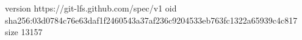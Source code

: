 version https://git-lfs.github.com/spec/v1
oid sha256:03d0784c76e63daf1f2460543a37af236c9204533eb763fc1322a65939c4c817
size 13157
